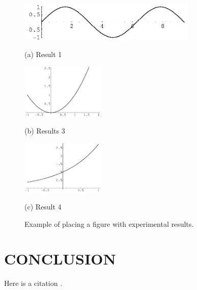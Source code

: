 \documentclass{article}
\begin{document}
\begin{figure}[htb]

\begin{minipage}[b]{1.0\linewidth}
  \centering
  \centerline{\includegraphics[width=8.5cm]{image1}}
  \centerline{(a) Result 1}\medskip
\end{minipage}
%
\begin{minipage}[b]{.48\linewidth}
  \centering
  \centerline{\includegraphics[width=4.0cm]{image3}}
  \centerline{(b) Results 3}\medskip
\end{minipage}
\hfill
\begin{minipage}[b]{0.48\linewidth}
  \centering
  \centerline{\includegraphics[width=4.0cm]{image4}}
  \centerline{(c) Result 4}\medskip
\end{minipage}
%
\caption{Example of placing a figure with experimental results.}
\label{fig:res}
%
\end{figure}



\section{CONCLUSION}
\label{sec:CONC}

Here is a citation \cite{C2}. 





\end{document}
